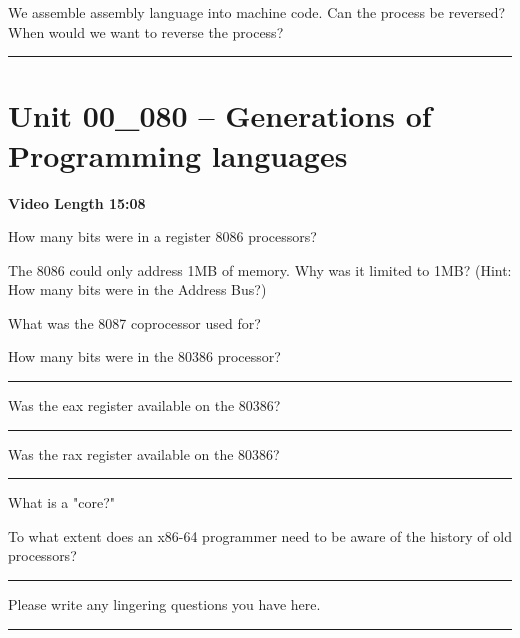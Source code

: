 \documentclass[letterpaper,12pt]{exam}
\newcommand{\unit}{Unit 00}
\begin{document}
\begin{questions}
\begin{samepage}
     \question We assemble assembly language into machine code.  Can the process be reversed?  When would we want to reverse the process?
     \vspace{5mm}
 \end{samepage}
 

 \rule{0.5\textwidth}{.4pt} %
\section*{\unit\_080 -- Generations of Programming languages}
\par{\selectfont\textbf{Video Length 15:08}}
\begin{samepage}
    \question How many bits were in a register 8086 processors?  
    \vspace{5mm}
\end{samepage}
\begin{samepage}
    \question The 8086 could only address 1MB of memory.  Why was it limited to 1MB? (Hint: How many bits were in the Address Bus?)
    \vspace{5mm}
\end{samepage}
\par
\begin{samepage}
    \question What was the 8087 coprocessor used for?
    \vspace{5mm}
\end{samepage}


  \begin{samepage}
      \question How many bits were in the 80386 processor? \rule{1cm}{0.15mm}
        \vspace{5mm}
      \par Was the eax register available on the 80386? \rule{1cm}{0.15mm}
       \vspace{5mm}
      \par Was the rax register available on the 80386? \rule{1cm}{0.15mm}
  \end{samepage}
\begin{samepage}
    \question What is a "core?"
    \vspace{5mm}
\end{samepage}
\par
 \begin{samepage}
     \question To what extent does an x86-64 programmer need to be aware of the history of old processors?
     \vspace{5mm}
 \end{samepage}
 \par
  
 

\begin{center}
    \rule{0.5\textwidth}{.4pt}
\end{center}
Please write any lingering questions you have here.
  
\rule{0.5\textwidth}{.4pt} %
\end{questions}
\end{document}
